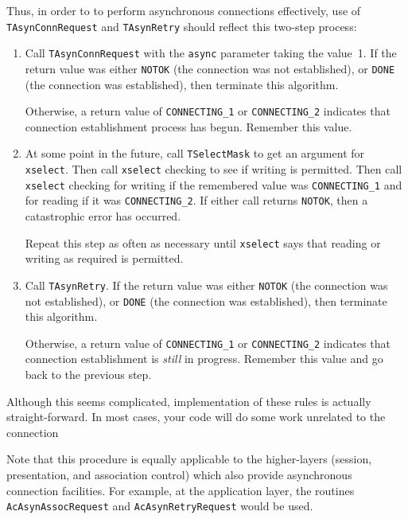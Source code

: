 Thus, in order to to perform asynchronous connections effectively,
use of \verb"TAsynConnRequest" and \verb"TAsynRetry" should reflect this
two-step process:
\begin{enumerate}
\item	Call \verb"TAsynConnRequest" with the \verb"async" parameter taking the
	value~1.
	If the return value was either \verb"NOTOK"
	(the connection was not established),
	or \verb"DONE" (the connection was established),
	then terminate this algorithm.

	Otherwise, a return value of \verb"CONNECTING_1" or
	\verb"CONNECTING_2" indicates that connection
	establishment process has begun. Remember this value.

\item	At some point in the future,
	call \verb"TSelectMask" to get an argument for \verb"xselect".
	Then call \verb"xselect" checking to see if writing is
	permitted.  Then call \verb"xselect" checking for writing if
	the remembered value was \verb"CONNECTING_1" and for reading
	if it was \verb"CONNECTING_2".  If either call returns
	\verb"NOTOK", then a catastrophic error has occurred.

	Repeat this step as often as necessary until \verb"xselect" says that
	reading or writing as required is permitted.

\item	Call \verb"TAsynRetry".
	If the return value was either \verb"NOTOK" (the connection
	was not established), or \verb"DONE" (the connection was
	established), then terminate this algorithm.

	Otherwise, a return value of \verb"CONNECTING_1" or
	\verb"CONNECTING_2" indicates that connection establishment is
	{\em still\/} in progress. Remember this value and go back to
	the previous step.

\end{enumerate}
Although this seems complicated,
implementation of these rules is actually straight-forward.
In most cases,
your code will do some work unrelated to the connection

Note that this procedure is equally applicable to the higher-layers
(session, presentation, and association control) which also provide
asynchronous connection facilities.
For example,
at the application layer,
the routines \verb"AcAsynAssocRequest" and \verb"AcAsynRetryRequest" would be
used.

